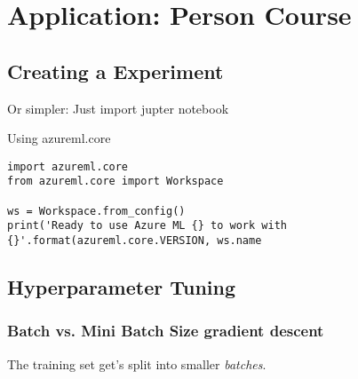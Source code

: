 \section{Application: Person Course}
\subsection{Creating a Experiment}

Or simpler: Just import jupter notebook
\begin{markdown}
Using azureml.core
\end{markdown}

\begin{lstlisting}[style=python]
import azureml.core
from azureml.core import Workspace

ws = Workspace.from_config()
print('Ready to use Azure ML {} to work with {}'.format(azureml.core.VERSION, ws.name	
\end{lstlisting}



\subsection{Hyperparameter Tuning} 




\subsubsection{Batch vs. Mini Batch Size gradient descent}

The training set get's split into smaller \textit{batches}.



